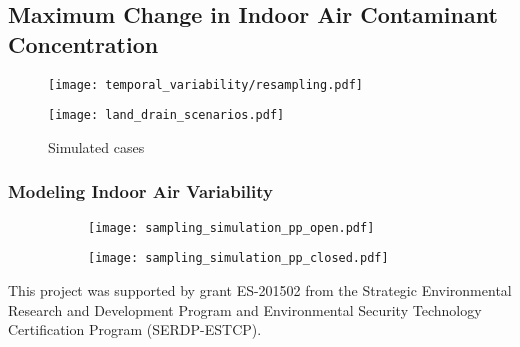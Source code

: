 \documentclass[journal=esthag,manuscript=article]{achemso}
\begin{document}
\subsection{Maximum Change in Indoor Air Contaminant Concentration}

\begin{figure}[!h]
	\centering
	\begin{minipage}[c]{0.49\textwidth}
		\centering
    \caption{ }
    \label{fig:resampling}
    \texttt{[image: temporal\_variability/resampling.pdf]}
	\end{minipage}
	\begin{minipage}[c]{0.49\textwidth}
		\centering
    \caption{Simulated cases}
    \label{fig:land_drain_scenarios}
    \texttt{[image: land\_drain\_scenarios.pdf]}
	\end{minipage}
\end{figure}



\subsubsection{Modeling Indoor Air Variability}

\begin{figure}[htb!]
  \caption{ }
  \label{fig:simulation_sampling}
  \begin{subfigure}{0.49\textwidth}
    \centering
    \caption{ }
    \label{fig:simulation_sampling_pp_open}
    \texttt{[image: sampling\_simulation\_pp\_open.pdf]}
  \end{subfigure}
  \begin{subfigure}{0.49\textwidth}
    \centering
    \caption{ }
    \label{fig:simulation_sampling_pp_closed}
    \texttt{[image: sampling\_simulation\_pp\_closed.pdf]}
  \end{subfigure}
\end{figure}


\begin{acknowledgement}
  This project was supported by grant ES-201502 from the Strategic Environmental Research and Development Program and Environmental Security Technology Certification Program (SERDP-ESTCP).
\end{acknowledgement}


\end{document}
